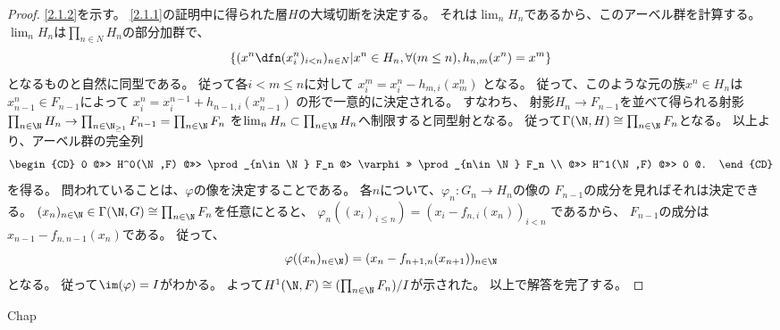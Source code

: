 \documentclass[uplatex,dvipdfmx]{jsarticle}
\begin{document}
\begin{proof}
  \ref{2.1.2}を示す。
  \ref{2.1.1}の証明中に得られた層\(H\)の大域切断を決定する。
  それは\(\lim_n H_n\)であるから、このアーベル群を計算する。
  \(\lim_nH_n\)は\(\prod_{n\in N}H_n\)の部分加群で、
  \[
  \left\{ (x^n \dfn (x_i^n)_{i<n})_{n\in N} \middle| x^n \in H_n,
  \forall (m \leq n), h_{n,m}(x^n) = x^m \right\}
  \]
  となるものと自然に同型である。
  従って各\(i < m\leq n\)に対して
  \(x^m_i = x^n_i - h_{m,i}(x^n_m)\)
  となる。
  従って、このような元の族\(x^n\in H_n\)は\(x^n_{n-1}\in F_{n-1}\)によって
  \(x^n_i = x^{n-1}_i + h_{n-1,i}(x^n_{n-1})\)
  の形で一意的に決定される。
  すなわち、
  射影\(H_n\to F_{n-1}\)を並べて得られる射影
  \(\prod_{n\in \N}H_n\to \prod_{n\in \N_{\geq 1}}F_{n-1} =
  \prod_{n\in \N}F_n\)
  を\(\lim_n H_n \subset \prod_{n\in \N}H_n\)へ制限すると同型射となる。
  従って\(\Gamma(\N,H) \cong \prod_{n\in \N}F_n\)となる。
  以上より、アーベル群の完全列
  \[
  \begin{CD}
    0 @>>> H^0(\N,F) @>>> \prod_{n\in \N} F_n @> \varphi >> \prod_{n\in \N} F_n \\
    @>>> H^1(\N,F) @>>> 0 @.
  \end{CD}
  \]
  を得る。
  問われていることは、\(\varphi\)の像を決定することである。
  各\(n\)について、\(\varphi_n:G_n\to H_n\)の像の
  \(F_{n-1}\)の成分を見ればそれは決定できる。
  \((x_n)_{n\in \N}\in \Gamma(\N,G) \cong \prod_{n\in \N}F_n\)を任意にとると、
  \(\varphi_n((x_i)_{i\leq n}) = (x_i-f_{n,i}(x_n))_{i<n}\)
  であるから、
  \(F_{n-1}\)の成分は\(x_{n-1}-f_{n,n-1}(x_n)\)である。
  従って、
  \[
  \varphi((x_n)_{n\in \N}) = (x_n - f_{n+1,n}(x_{n+1}))_{n\in \N}
  \]
  となる。
  従って\(\im(\varphi) = I\)がわかる。
  よって\(H^1(\N,F) \cong (\prod_{n\in \N}F_n)/I\)が示された。
  以上で解答を完了する。
\end{proof}



\ifcsname Chap\endcsname\else
\printbibliography
\end{document}
